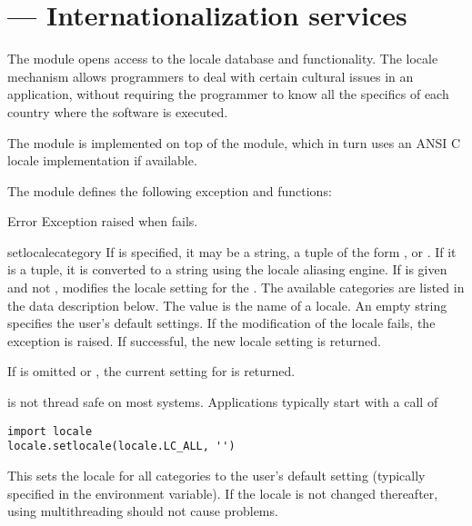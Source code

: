 \section{ ---
         Internationalization services}



The  module opens access to the \POSIX{} locale
database and functionality. The \POSIX{} locale mechanism allows
programmers to deal with certain cultural issues in an application,
without requiring the programmer to know all the specifics of each
country where the software is executed.

The  module is implemented on top of the
 module, which in turn uses an
ANSI C locale implementation if available.

The  module defines the following exception and
functions:


\begin{excdesc}{Error}
  Exception raised when  fails.
\end{excdesc}

\begin{funcdesc}{setlocale}{category}
  If  is specified, it may be a string, a tuple of the
  form , or .
  If it is a tuple, it is converted to a string using the locale
  aliasing engine.  If  is given and not ,
   modifies the locale setting for the
  .  The available categories are listed in the data
  description below.  The value is the name of a locale.  An empty
  string specifies the user's default settings. If the modification of
  the locale fails, the exception  is raised.  If
  successful, the new locale setting is returned.

  If  is omitted or , the current setting for
   is returned.

   is not thread safe on most systems.
  Applications typically start with a call of

\begin{verbatim}
import locale
locale.setlocale(locale.LC_ALL, '')
\end{verbatim}

  This sets the locale for all categories to the user's default
  setting (typically specified in the  environment
  variable).  If the locale is not changed thereafter, using
  multithreading should not cause problems.

\end{funcdesc}

